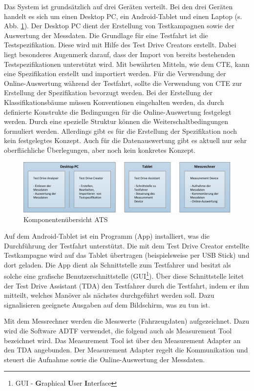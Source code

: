 \documentclass[12pt,a4paper]{report}
\begin{document}
Das System ist grundsätzlich auf drei Geräten verteilt. Bei den drei Geräten handelt es sich um einen Desktop PC, ein Android-Tablet und einen Laptop (s. Abb. \ref{pic:Komponentenuebersicht}). Der Desktop PC dient der Erstellung von Testkampagnen sowie der Auswertung der Messdaten. Die Grundlage für eine Testfahrt ist die Testspezifikation. Diese wird mit Hilfe des Test Drive Creators erstellt. Dabei liegt besonderes Augenmerk darauf, dass der Import von bereits bestehenden Testspezifikationen unterstützt wird. Mit bewährten Mitteln, wie dem CTE, kann eine Spezifikation erstellt und importiert werden. Für die Verwendung der Online-Auswertung während der Testfahrt, sollte die Verwendung von CTE zur Erstellung der Spezifikation bevorzugt werden. Bei der Erstellung der Klassifikationsbäume müssen Konventionen eingehalten werden, da durch definierte Konstrukte die Bedingungen für die Online-Auswertung festgelegt werden. Durch eine spezielle Struktur können die Weiterschaltbedingungen formuliert werden. Allerdings gibt es für die Erstellung der Spezifikation noch kein festgelegtes Konzept. Auch für die Datenauswertung gibt es aktuell nur sehr oberflächliche Überlegungen, aber noch kein konkretes Konzept.
\begin{figure}
\includegraphics[width=1\linewidth]{Darstellungen/Systemuebersicht-Grundlagen}
\caption{Komponentenübersicht ATS}\label{pic:Komponentenuebersicht}
\end{figure}
Auf dem Android-Tablet ist ein Programm (App) installiert, was die Durchführung der Testfahrt unterstützt. Die mit dem Test Drive Creator erstellte Testkampagne wird auf das Tablet übertragen (beispielsweise per USB Stick) und dort geladen. Die App dient als Schnittstelle zum Testfahrer und besitzt als solche eine grafische Benutzerschnittstelle (GUI\footnote{GUI - \textbf{G}raphical \textbf{U}ser \textbf{I}nterface}). Über diese Schnittstelle leitet der Test Drive Assistant (TDA) den Testfahrer durch die Testfahrt, indem er ihm mitteilt, welches Manöver als nächstes durchgeführt werden soll. Dazu signalisieren geeignete Ausgaben auf dem Bildschirm, was zu tun ist. 

Mit dem Messrechner werden die Messwerte (Fahrzeugdaten) aufgezeichnet. Dazu wird die Software ADTF verwendet, die folgend auch als Measurement Tool bezeichnet wird. Das Measurement Tool ist über den Measurement Adapter an den TDA angebunden. Der Measurement Adapter regelt die Kommunikation und steuert die Aufnahme sowie die Online-Auswertung der Messdaten.
\end{document}
